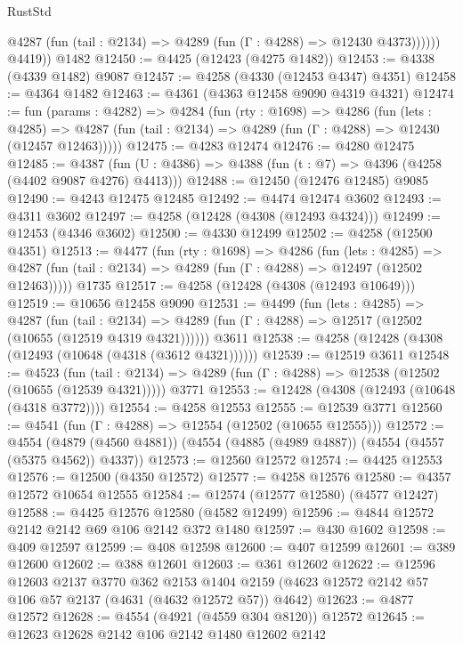 \begin{lexlean}{RustStd}
\begin{coremodule}
              @4287 (fun (tail : @2134) => @4289 (fun (Γ : @4288) => @12430 @4373))))))
        @4419))
    @1482
@12450 := @4425 (@12423 (@4275 @1482))
@12453 := @4338 (@4339 @1482) @9087
@12457 := @4258 (@4330 (@12453 @4347) @4351)
@12458 := @4364 @1482
@12463 := @4361 (@4363 @12458 @9090 @4319 @4321)
@12474 := fun (params : @4282) =>
  @4284
    (fun (rty : @1698) =>
    @4286
      (fun (lets : @4285) =>
      @4287 (fun (tail : @2134) => @4289 (fun (Γ : @4288) => @12430 (@12457 @12463)))))
@12475 := @4283 @12474
@12476 := @4280 @12475
@12485 := @4387 (fun (U : @4386) => @4388 (fun (t : @7) => @4396 (@4258 (@4402 @9087 @4276) @4413)))
@12488 := @12450 (@12476 @12485) @9085
@12490 := @4243 @12475 @12485
@12492 := @4474 @12474 @3602
@12493 := @4311 @3602
@12497 := @4258 (@12428 (@4308 (@12493 @4324)))
@12499 := @12453 (@4346 @3602)
@12500 := @4330 @12499
@12502 := @4258 (@12500 @4351)
@12513 := @4477
    (fun (rty : @1698) =>
    @4286
      (fun (lets : @4285) =>
      @4287 (fun (tail : @2134) => @4289 (fun (Γ : @4288) => @12497 (@12502 @12463)))))
    @1735
@12517 := @4258 (@12428 (@4308 (@12493 @10649)))
@12519 := @10656 @12458 @9090
@12531 := @4499
    (fun (lets : @4285) =>
    @4287
      (fun (tail : @2134) =>
      @4289 (fun (Γ : @4288) => @12517 (@12502 (@10655 (@12519 @4319 @4321))))))
    @3611
@12538 := @4258 (@12428 (@4308 (@12493 (@10648 (@4318 (@3612 @4321))))))
@12539 := @12519 @3611
@12548 := @4523
    (fun (tail : @2134) => @4289 (fun (Γ : @4288) => @12538 (@12502 (@10655 (@12539 @4321)))))
    @3771
@12553 := @12428 (@4308 (@12493 (@10648 (@4318 @3772))))
@12554 := @4258 @12553
@12555 := @12539 @3771
@12560 := @4541 (fun (Γ : @4288) => @12554 (@12502 (@10655 @12555)))
@12572 := @4554
    (@4879 (@4560 @4881))
    (@4554 (@4885 (@4989 @4887)) (@4554 (@4557 (@5375 @4562)) @4337))
@12573 := @12560 @12572
@12574 := @4425 @12553
@12576 := @12500 (@4350 @12572)
@12577 := @4258 @12576
@12580 := @4357 @12572 @10654 @12555
@12584 := @12574 (@12577 @12580) (@4577 @12427)
@12588 := @4425 @12576 @12580 (@4582 @12499)
@12596 := @4844 @12572 @2142 @2142 @69 @106 @2142 @372 @1480
@12597 := @430 @1602
@12598 := @409 @12597
@12599 := @408 @12598
@12600 := @407 @12599
@12601 := @389 @12600
@12602 := @388 @12601
@12603 := @361 @12602
@12622 := @12596
    @12603
    @2137
    @3770
    @362
    @2153
    @1404
    @2159
    (@4623 @12572 @2142 @57 @106 @57 @2137 (@4631 (@4632 @12572 @57)) @4642)
@12623 := @4877 @12572
@12628 := @4554 (@4921 (@4559 @304 @8120)) @12572
@12645 := @12623
    @12628
    @2142
    @106
    @2142
    @1480
    @12602
    @2142

\end{coremodule}
\end{lexlean}
